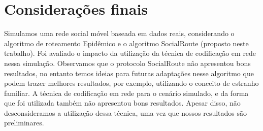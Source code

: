 \section{Considerações finais}

Simulamos uma rede social móvel baseada em dados reais, considerando o
algoritmo de roteamento Epidêmico e o algoritmo SocialRoute (proposto
neste trabalho). Foi avaliado o impacto da utilização da técnica de
codificação em rede nessa simulação. Observamos que o protocolo
SocialRoute não apresentou bons resultados, no entanto temos ideias para
futuras adaptações nesse algoritmo que podem trazer melhores resultados,
por exemplo, utilizando o conceito de estranho familiar. A técnica de
codificação em rede para o cenário simulado, e da forma que foi
utilizada também não apresentou bons resultados. Apesar disso, não
desconsideramos a utilização dessa técnica, uma vez que nossos
resultados são preliminares.
